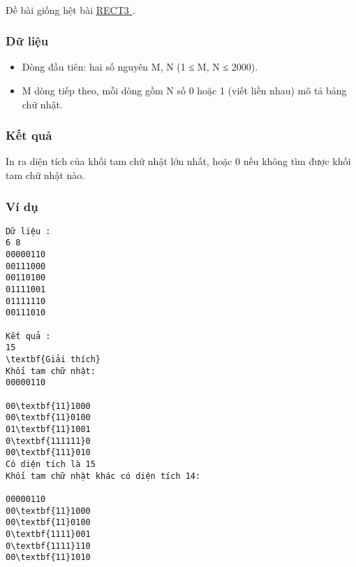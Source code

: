 

 

Đề bài giống hệt bài \href{http://vnoi.info/problems/show/RECT3/}{ RECT3 } .

\subsubsection{Dữ liệu}
\begin{itemize}
	\item Dòng đầu tiên: hai số nguyên M, N (1 ≤ M, N ≤ 2000).
	\item M dòng tiếp theo, mỗi dòng gồm N số 0 hoặc 1 (viết liền nhau) mô tả bảng chữ nhật.
\end{itemize}

\subsubsection{Kết quả}

In ra diện tích của khối tam chữ nhật lớn nhất, hoặc 0 nếu không tìm được khối tam chữ nhật nào.

\subsubsection{Ví dụ}
\begin{verbatim}
Dữ liệu :
6 8
00000110
00111000
00110100
01111001
01111110
00111010

Kết quả :
15
\textbf{Giải thích}
Khối tam chữ nhật:
00000110

00\textbf{11}1000
00\textbf{11}0100
01\textbf{11}1001
0\textbf{111111}0
00\textbf{111}010
Có diện tích là 15
Khối tam chữ nhật khác có diện tích 14:

00000110
00\textbf{11}1000
00\textbf{11}0100
0\textbf{1111}001
0\textbf{1111}110
00\textbf{11}1010
\end{verbatim}